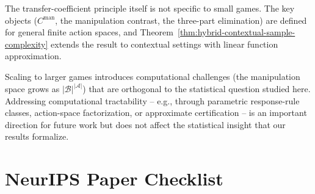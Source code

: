 \documentclass{article}
\newcommand{\cA}{\mathcal{A}}
\newcommand{\cB}{\mathcal{B}}
\begin{document}
The transfer-coefficient principle itself is not specific to small games. The key objects ($C^{\mathrm{man}}$, the manipulation contrast, the three-part elimination) are defined for general finite action spaces, and Theorem~\ref{thm:hybrid-contextual-sample-complexity} extends the result to contextual settings with linear function approximation.

Scaling to larger games introduces computational challenges (the manipulation space grows as $|\cB|^{|\cA|}$) that are orthogonal to the statistical question studied here. Addressing computational tractability -- e.g., through parametric response-rule classes, action-space factorization, or approximate certification -- is an important direction for future work but does not affect the statistical insight that our results formalize.

\newpage
\section*{NeurIPS Paper Checklist}

\end{document}
